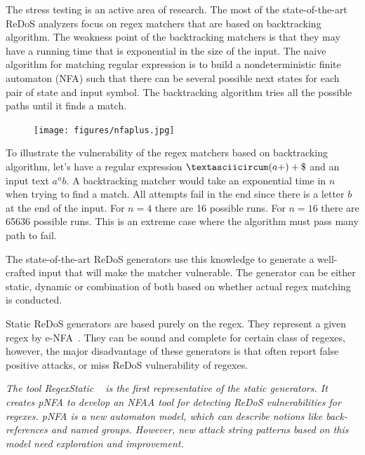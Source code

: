 \documentclass[acmsmall,screen]{acmart}
\begin{document}
The stress testing is an active area of research.
%
The most of the state-of-the-art ReDoS analyzers focus on regex matchers that are based on backtracking algorithm.
%
The weakness point of the backtracking
matchers is that they may have a running time that is exponential in the size of the input.
%
The naive algorithm for matching regular expression is to build a nondeterministic finite automaton (NFA) such that there can
be several possible next states for each pair of state and input symbol. 
%
The backtracking algorithm tries all the possible paths until it finds a match.

\begin{figure}
  \vspace{-3mm}
  \hspace{-10mm}
  \begin{center}
    \texttt{[image: figures/nfaplus.jpg]}
  \end{center}
  \label{fig:nfaplus}
\end{figure}

\begin{example}
To illustrate the vulnerability of the regex matchers based on backtracking algorithm, let's have a regular expression $\textasciicircum(a+)+\$$
and an input text $a^nb$.
%
A backtracking matcher would take an exponential time in $n$ when trying to find a match.
%
All attempts fail in the end since there is a letter $b$ at the end of the input.
%
For $n=4$ there are 16 possible runs. 
%
For $n=16$ there are 65636 possible runs. 
%
This is an extreme case where the algorithm must pass many path to fail.
\end{example}

The state-of-the-art ReDoS generators use this knowledge to generate a well-crafted input that will make the matcher vulnerable.
%
The generator can be either static, dynamic or combination of both based on whether actual regex matching is conducted.
%

Static ReDoS generators are based purely on the regex.
%
They represent a given regex by e-NFA~\cite{staticAna}.
%
They can be sound and complete for certain class of regexes,
however, the major disadvantage of these generators is that 
often report false positive attacks, or miss ReDoS vulnerability
of regexes.



\emph{
The tool RegexStatic ~\cite{weideman} is the first representative of the static generators.
%
It creates pNFA to develop an NFAA tool for detecting ReDoS vulnerabilities
for regexes. 
%
pNFA is a new automaton model, which can
describe notions like back-references and named groups. 
%
However,
new attack string patterns based on this model need exploration
and improvement.
%
}
\end{document}
